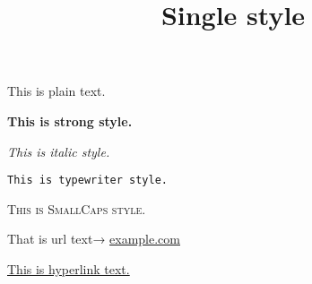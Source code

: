 \documentclass[a4paper,11pt,oneside,openany,report]{jsbook}
\title{Single style}
\begin{document}
\maketitle
This is plain text.

\textbf{This is strong style.}

\textsl{This is italic style.}

\texttt{This is typewriter style.}

\textsc{This is SmallCaps style.}

That is url text→
\url{example.com}

\href{example.com}{This is hyperlink text.}
\end{document}
